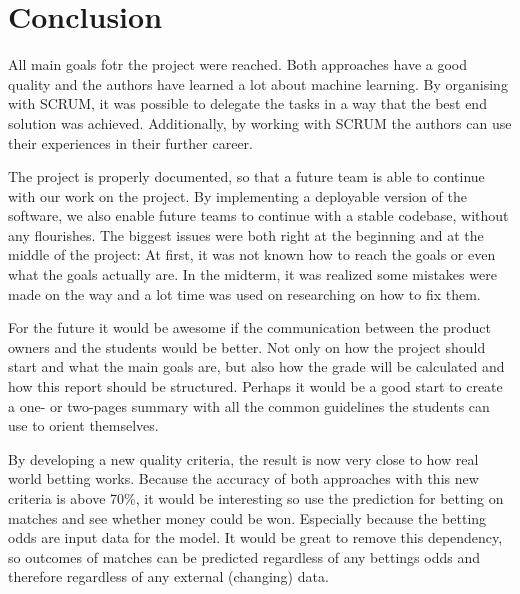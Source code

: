 
\chapter{Conclusion}
\label{chap:conclusion}
All main goals fotr the project were reached. Both approaches have a good quality and the authors have learned a lot about machine learning. By organising with SCRUM, it was possible to delegate the tasks in a way that the best end solution was achieved. Additionally, by working with SCRUM the authors can use their experiences in their further career.

The project is properly documented, so that a future team is able to continue with our work on the project. By implementing a deployable version of the software, we also enable future teams to continue with a stable codebase, without any flourishes. The biggest issues were both right at the beginning and at the middle of the project: At first, it was not known how to reach the goals or even what the goals actually are. In the midterm, it was realized some mistakes were made on the way and a lot time was used on researching on how to fix them.

For the future it would be awesome if the communication between the product owners and the students would be better. Not only on how the project should start and what the main goals are, but also how the grade will be calculated and how this report should be structured. Perhaps it would be a good start to create a one- or two-pages summary with all the common guidelines the students can use to orient themselves.


By developing a new quality criteria, the result is now very close to how real world betting works. Because the accuracy of both approaches with this new criteria is above 70\%, it would be interesting so use the prediction for betting on matches and see whether money could be won. Especially because the betting odds are input data for the model. It would be great to remove this dependency, so outcomes of matches can be predicted regardless of any bettings odds and therefore regardless of any external (changing) data.

